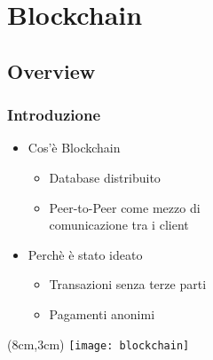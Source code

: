 \section{Blockchain}
\subsection{Overview}
\begin{frame}
  \frametitle{Introduzione}

  \begin{itemize}
   \item<1-> Cos'è Blockchain
   \begin{itemize}
    \item Database distribuito
    \item Peer-to-Peer come mezzo di \\
    comunicazione tra i client
   \end{itemize}

   \item<2-> Perchè è stato ideato
   \begin{itemize}
    \item Transazioni senza terze parti
    \item Pagamenti anonimi
   \end{itemize}

  \end{itemize}

 \begin{textblock*}{5cm}(8cm,3cm)
  \texttt{[image: blockchain]}
 \end{textblock*}

\end{frame}
